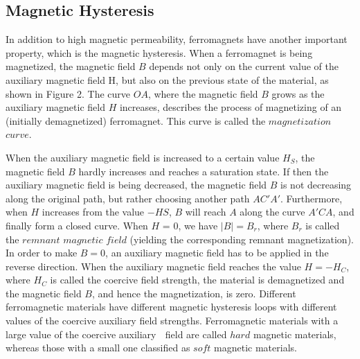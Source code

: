 \documentclass[12pt]{article}
\begin{document}
\subsection{Magnetic Hysteresis}
In addition to high magnetic permeability, ferromagnets have another important property, which is the magnetic hysteresis. When a ferromagnet is being magnetized, the
magnetic field $B$ depends not only on the current value of the auxiliary magnetic field
H, but also on the previous state of the material, as shown in Figure 2. The curve $OA$,
where the magnetic field $B$ grows as the auxiliary magnetic field $H$ increases, describes
the process of magnetizing of an (initially demagnetized) ferromagnet. This curve is called
the $magnetization$ $curve$.
\par When the auxiliary magnetic field is increased to a certain value $H_S$, the magnetic field $B$ hardly increases and reaches a saturation state. If then the auxiliary magnetic field is being decreased, the magnetic field $B$ is not decreasing along the original path, but rather choosing another path $AC'A'$. Furthermore, when $H$ increases from the value $-HS$, $B$
will reach $A$ along the curve $A'CA$, and finally form a closed curve. When $H$ = 0, we
have $|B|=B_r$, where $B_r$ is called the $remnant$ $magnetic$ $field$ (yielding the corresponding remnant magnetization). In order to make $B=0$, an auxiliary magnetic field has to be applied in the reverse direction. When the auxiliary magnetic field reaches the value
$H=-H_C$, where $H_C$ is called the coercive field strength, the material is demagnetized
and the magnetic field $B$, and hence the magnetization, is zero. Different ferromagnetic materials have different magnetic hysteresis loops with different values of the coercive auxiliary field strengths. Ferromagnetic materials with a large value of the coercive auxiliary  field are called $hard$ magnetic materials, whereas those with a small one classified as $soft$ magnetic materials.
\end{document}
